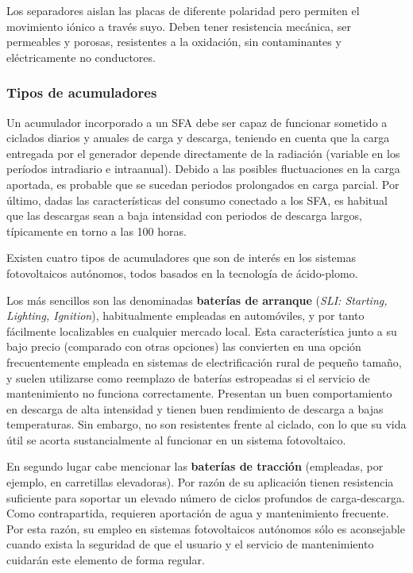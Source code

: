 Los separadores aislan las placas de diferente polaridad pero permiten
el movimiento iónico a través suyo. Deben tener resistencia mecánica,
ser permeables y porosas, resistentes a la oxidación, sin contaminantes
y eléctricamente no conductores.




\subsubsection{Tipos de acumuladores}

Un acumulador incorporado a un SFA debe ser capaz de funcionar sometido
a ciclados diarios y anuales de carga y descarga, teniendo en cuenta
que la carga entregada por el generador depende directamente de la
radiación (variable en los períodos intradiario e intraanual). Debido
a las posibles fluctuaciones en la carga aportada, es probable que
se sucedan periodos prolongados en carga parcial. Por último, dadas
las características del consumo conectado a los SFA, es habitual que
las descargas sean a baja intensidad con periodos de descarga largos,
típicamente en torno a las 100 horas.

Existen cuatro tipos de acumuladores que son de interés en los sistemas
fotovoltaicos autónomos, todos basados en la tecnología de ácido-plomo.

Los más sencillos son las denominadas \textbf{baterías de arranque}
(\emph{SLI: Starting, Lighting, Ignition}), habitualmente empleadas
en automóviles, y por tanto fácilmente localizables en cualquier mercado
local. Esta característica junto a su bajo precio (comparado con otras
opciones) las convierten en una opción frecuentemente empleada en
sistemas de electrificación rural de pequeño tamaño, y suelen utilizarse
como reemplazo de baterías estropeadas si el servicio de mantenimiento
no funciona correctamente. Presentan un buen comportamiento en descarga
de alta intensidad y tienen buen rendimiento de descarga a bajas temperaturas.
Sin embargo, no son resistentes frente al ciclado, con lo que su vida
útil se acorta sustancialmente al funcionar en un sistema fotovoltaico.

En segundo lugar cabe mencionar las \textbf{baterías de tracción}
(empleadas, por ejemplo, en carretillas elevadoras). Por razón de
su aplicación tienen resistencia suficiente para soportar un elevado
número de ciclos profundos de carga-descarga. Como contrapartida,
requieren aportación de agua y mantenimiento frecuente. Por esta razón,
su empleo en sistemas fotovoltaicos autónomos sólo es aconsejable
cuando exista la seguridad de que el usuario y el servicio de mantenimiento
cuidarán este elemento de forma regular.

